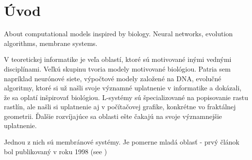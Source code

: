 \chapter*{Úvod}

About computational models inspired by biology. Neural networks, evolution algorithms, membrane systems.

V teoretickej informatike je veľa oblastí, ktoré sú motivované inými vednými
disciplínami. Veľkú skupinu tvoria modely motivované biológiou. Patria sem
napríklad neurónové siete, výpočtové modely založené na DNA, evolučné algoritmy, ktoré
si už našli svoje významné uplatnenie v informatike a dokázali, že sa oplatí
inšpirovať biológiou. L-systémy sú špecializované na popisovanie rastu rastlín, ale našli si uplatnenie aj v počítačovej grafike, konkrétne vo fraktálnej geometrii. Ďalšie rozvíjajúce sa oblasti ešte čakajú na svoje významnejšie uplatnenie.

Jednou z nich sú membránové systémy. Je pomerne mladá oblasť - prvý článok
bol publikovaný v roku 1998 (see \cite{Paun98})